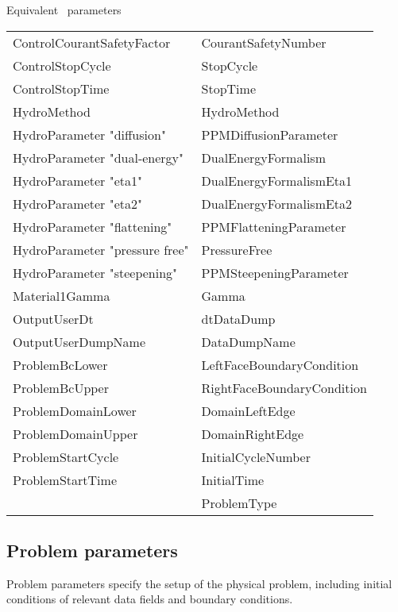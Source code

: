 \documentclass{article}
\begin{document}
Equivalent \enzo\ parameters

\begin{tabular}{ll}
ControlCourantSafetyFactor        & CourantSafetyNumber \\
ControlStopCycle           & StopCycle \\
ControlStopTime            & StopTime \\
HydroMethod                & HydroMethod \\
HydroParameter "diffusion"    & PPMDiffusionParameter \\
HydroParameter "dual-energy"  & DualEnergyFormalism \\
HydroParameter "eta1"    & DualEnergyFormalismEta1 \\
HydroParameter "eta2"    & DualEnergyFormalismEta2 \\
HydroParameter "flattening"   & PPMFlatteningParameter \\
HydroParameter "pressure free" & PressureFree \\
HydroParameter "steepening"  & PPMSteepeningParameter \\
Material1Gamma             & Gamma \\
OutputUserDt               & dtDataDump \\
OutputUserDumpName         & DataDumpName \\
ProblemBcLower             & LeftFaceBoundaryCondition \\
ProblemBcUpper             & RightFaceBoundaryCondition \\
ProblemDomainLower         & DomainLeftEdge \\
ProblemDomainUpper         & DomainRightEdge \\
ProblemStartCycle          & InitialCycleNumber \\
ProblemStartTime           & InitialTime \\
                           & ProblemType \\
\end{tabular}

\subsection{Problem parameters}

Problem parameters specify the setup of the physical problem,
including initial conditions of relevant data fields and boundary
conditions.
\end{document}
